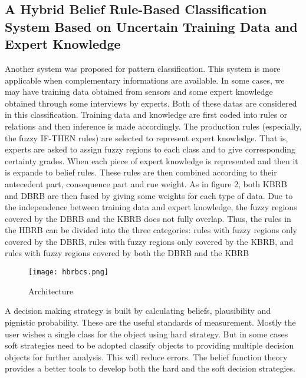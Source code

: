 \documentclass[10pt,a4paper,journal]{IEEEtran}
\begin{document}
\subsection{A Hybrid Belief Rule-Based Classification System Based on Uncertain Training Data and Expert Knowledge}
\hspace{2em} 
Another system was proposed \cite{7} for pattern classification. This system is more applicable when complementary informations\cite{8} are available. In some cases, we may have training data obtained from sensors and some expert knowledge obtained through some interviews by experts. Both of these datas are considered in this classification. Training data and knowledge are first coded into rules or relations and then inference is made accordingly. The production rules (especially, the fuzzy IF-THEN rules) are selected to represent expert knowledge. That is, experts are asked to assign fuzzy regions to each class and to give corresponding certainty grades. When each piece of expert knowledge is represented and then it is expande to belief rules. These rules are then combined according to their antecedent part, consequence part and rue weight. As in figure 2, both KBRB and DBRB are then fused by giving some weights for each type of data. Due to the independence between training data and expert knowledge, the fuzzy regions covered by the DBRB and the KBRB does not fully overlap. Thus, the rules in the HBRB can be divided into the three categories: rules with fuzzy regions only covered by the DBRB, rules with fuzzy regions only covered by the KBRB, and rules with fuzzy regions covered by both the DBRB and the KBRB
\begin{figure}
\hbox{\texttt{[image: hbrbcs.png]}}
\caption{Architecture}
\end{figure}
A decision making strategy is built by calculating beliefs, plausibility and pignistic probability. These are the useful standards of measurement. Mostly the user wishes a single class for the object using hard strategy. But in some cases soft strategies need to be adopted classify objects to providing multiple decision objects for further analysis. This will reduce errors. The belief function theory provides a better tools to develop both the hard and the soft decision strategies.\\
\end{document}
